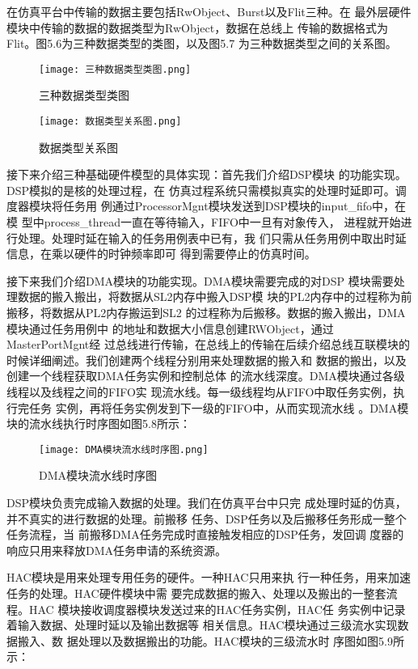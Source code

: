 在仿真平台中传输的数据主要包括RwObject、Burst以及Flit三种。在
最外层硬件模块中传输的数据的数据类型为RwObject，数据在总线上
传输的数据格式为Flit。图5.6为三种数据类型的类图，以及图5.7
为三种数据类型之间的关系图。

\begin{figure}
    \centering
    \texttt{[image: 三种数据类型类图.png]}
    \caption{三种数据类型类图}
    \label{fig:badge}
\end{figure}

\begin{figure}
    \centering
    \texttt{[image: 数据类型关系图.png]}
    \caption{数据类型关系图}
    \label{fig:badge}
\end{figure}

接下来介绍三种基础硬件模型的具体实现：首先我们介绍DSP模块
的功能实现。DSP模拟的是核的处理过程，在
仿真过程系统只需模拟真实的处理时延即可。调度器模块将任务用
例通过ProcessorMgnt模块发送到DSP模块的input\_fifo中，在模
型中process\_thread一直在等待输入，FIFO中一旦有对象传入，
进程就开始进行处理。处理时延在输入的任务用例表中已有，我
们只需从任务用例中取出时延信息，在乘以硬件的时钟频率即可
得到需要停止的仿真时间。

接下来我们介绍DMA模块的功能实现。DMA模块需要完成的对DSP
模块需要处理数据的搬入搬出，将数据从SL2内存中搬入DSP模
块的PL2内存中的过程称为前搬移，将数据从PL2内存搬运到SL2
的过程称为后搬移。数据的搬入搬出，DMA模块通过任务用例中
的地址和数据大小信息创建RWObject，通过MasterPortMgnt经
过总线进行传输，在总线上的传输在后续介绍总线互联模块的
时候详细阐述。我们创建两个线程分别用来处理数据的搬入和
数据的搬出，以及创建一个线程获取DMA任务实例和控制总体
的流水线深度。DMA模块通过各级线程以及线程之间的FIFO实
现流水线。每一级线程均从FIFO中取任务实例，执行完任务
实例，再将任务实例发到下一级的FIFO中，从而实现流水线
。DMA模块的流水线执行时序图如图5.8所示：

\begin{figure}
    \centering
    \texttt{[image: DMA模块流水线时序图.png]}
    \caption{DMA模块流水线时序图}
    \label{fig:badge}
\end{figure}

DSP模块负责完成输入数据的处理。我们在仿真平台中只完
成处理时延的仿真，并不真实的进行数据的处理。前搬移
任务、DSP任务以及后搬移任务形成一整个任务流程，当
前搬移DMA任务完成时直接触发相应的DSP任务，发回调
度器的响应只用来释放DMA任务申请的系统资源。

HAC模块是用来处理专用任务的硬件。一种HAC只用来执
行一种任务，用来加速任务的处理。HAC硬件模块中需
要完成数据的搬入、处理以及搬出的一整套流程。HAC
模块接收调度器模块发送过来的HAC任务实例，HAC任
务实例中记录着输入数据、处理时延以及输出数据等
相关信息。HAC模块通过三级流水实现数据搬入、数
据处理以及数据搬出的功能。HAC模块的三级流水时
序图如图5.9所示：


